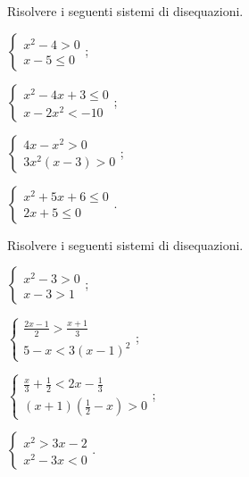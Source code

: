 \begin{esercizio}[\Ast]
 \label{ese:4.71}
Risolvere i seguenti sistemi di disequazioni.
\begin{multicols}{2}
\begin{enumeratea}
\item $\left\{\begin{array}{l}x^2-4>0\\x-5\le 0\end{array}\right.$;
\item $\left\{\begin{array}{l}x^2-4x+3\le 0\\x-2x^2<-10\end{array}\right.$;
\item $\left\{\begin{array}{l}4x-x^2>0\\3x^2(x-3)>0\end{array}\right.$;
\item $\left\{\begin{array}{l}x^2+5x+6\le 0\\2x+5\le 0\end{array}\right.$.
\end{enumeratea}
\end{multicols}
\end{esercizio}

\begin{esercizio}[\Ast]
 \label{ese:4.72}
Risolvere i seguenti sistemi di disequazioni.
\begin{multicols}{2}
\begin{enumeratea}
\item $\left\{\begin{array}{l}x^2-3>0\\x-3>1\end{array}\right.$;
\item $\left\{\begin{array}{l}\frac{2x-1}{2}>\frac{x+1}{3}\\5-x<3(x-1)^{2}\end{array}\right.$;
\item $\left\{\begin{array}{l}\frac{x}{3}+\frac{1}{2}<2x-\frac{1}{3}\\(x+1)\left(\frac{1}{2}-x\right)>0\end{array}\right.$;
\item $\left\{\begin{array}{l}x^2>3x-2\\x^{2}-3x<0\end{array}\right.$.
\end{enumeratea}
\end{multicols}
\end{esercizio}

